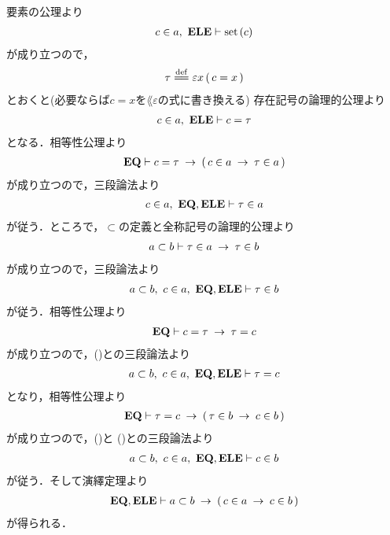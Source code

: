 	\begin{prf}	
		要素の公理より
		\begin{align}
			c \in a,\ \mbox{{\bf ELE}} \vdash \operatorname*{set}\hspace{0.15em}(c)
		\end{align}
		が成り立つので，
		\begin{align}
			\tau \defeq \varepsilon x\, (\, c=x\, )
		\end{align}
		とおくと(必要ならば$c = x$を$\lang{\varepsilon}$の式に書き換える)
		存在記号の論理的公理より
		\begin{align}
			c \in a,\ \mbox{{\bf ELE}} \vdash c = \tau
			\label{fom:subclass_contains_all_elements_1}
		\end{align}
		となる．相等性公理より
		\begin{align}
			\mbox{{\bf EQ}} \vdash c = \tau \hspace{0.25em}\rightarrow\hspace{0.25em} (\, c \in a \hspace{0.25em}\rightarrow\hspace{0.25em} \tau \in a\, )
		\end{align}
		が成り立つので，三段論法より
		\begin{align}
			c \in a,\ \mbox{{\bf EQ}},\mbox{{\bf ELE}} \vdash \tau \in a
		\end{align}
		が従う．ところで，$\subset$の定義と全称記号の論理的公理より
		\begin{align}
			a \subset b \vdash \tau \in a \hspace{0.25em}\rightarrow\hspace{0.25em} \tau \in b
		\end{align}
		が成り立つので，三段論法より
		\begin{align}
			a \subset b,\ c \in a,\ \mbox{{\bf EQ}},\mbox{{\bf ELE}} \vdash \tau \in b
			\label{fom:subclass_contains_all_elements_2}
		\end{align}
		が従う．相等性公理より
		\begin{align}
			\mbox{{\bf EQ}} \vdash c = \tau \hspace{0.25em}\rightarrow\hspace{0.25em} \tau = c
		\end{align}
		が成り立つので，()との三段論法より
		\begin{align}
			a \subset b,\ c \in a,\ \mbox{{\bf EQ}},\mbox{{\bf ELE}} \vdash \tau = c
			\label{fom:subclass_contains_all_elements_3}
		\end{align}
		となり，相等性公理より
		\begin{align}
			\mbox{{\bf EQ}} \vdash \tau = c \hspace{0.25em}\rightarrow\hspace{0.25em} (\, \tau \in b \hspace{0.25em}\rightarrow\hspace{0.25em} c \in b\, )
		\end{align}
		が成り立つので，()と
		()との三段論法より
		\begin{align}
			a \subset b,\ c \in a,\ \mbox{{\bf EQ}},\mbox{{\bf ELE}} \vdash c \in b
		\end{align}
		が従う．そして演繹定理より
		\begin{align}
			\mbox{{\bf EQ}},\mbox{{\bf ELE}} \vdash 
			a \subset b \hspace{0.25em}\rightarrow\hspace{0.25em} (\, c \in a \hspace{0.25em}\rightarrow\hspace{0.25em} c \in b\, )
		\end{align}
		が得られる．
		\QED
	\end{prf}
	
